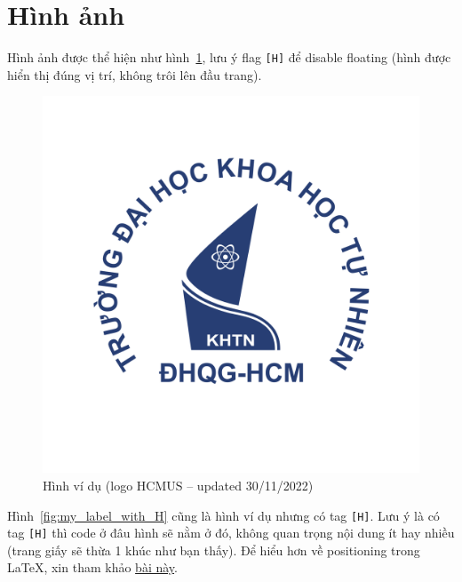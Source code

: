 \section{Hình ảnh}
Hình ảnh được thể hiện như hình~\ref{fig:my_label}, lưu ý flag \texttt{[H]} để disable floating (hình được hiển thị đúng vị trí, không trôi lên đầu trang).
\begin{figure}%
    \centering
    \includegraphics[scale=.4]{img/hcmus-logo.png}
    \caption{Hình ví dụ (logo HCMUS {--} updated 30/11/2022)}\label{fig:my_label}
\end{figure}

Hình~\ref{fig:my_label_with_H} cũng là hình ví dụ nhưng có tag \texttt{[H]}. Lưu ý là có tag \texttt{[H]} thì code ở đâu hình sẽ nằm ở đó, không quan trọng nội dung ít hay nhiều (trang giấy sẽ thừa 1 khúc như bạn thấy). Để hiểu hơn về positioning trong LaTeX, xin tham khảo \href{https://www.overleaf.com/learn/latex/Positioning_images_and_tables}{bài này}.

